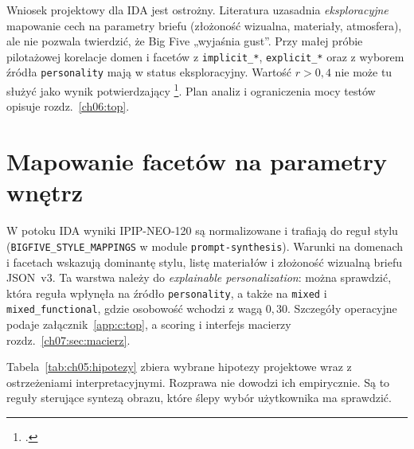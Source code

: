 Wniosek projektowy dla IDA jest ostrożny. Literatura uzasadnia \emph{eksploracyjne} mapowanie cech na parametry briefu (złożoność wizualna, materiały, atmosfera), ale nie pozwala twierdzić, że Big Five „wyjaśnia gust”.
Przy małej próbie pilotażowej korelacje domen i facetów z \texttt{implicit\_*}, \texttt{explicit\_*} oraz z wyborem źródła \texttt{personality} mają w  status eksploracyjny. Wartość $r\!>\!0{,}4$ nie może tu służyć jako wynik potwierdzający \footcite{idaPlatform2026}.
Plan analiz i ograniczenia mocy testów opisuje rozdz.~\ref{ch06:top}.

\section{Mapowanie facetów na parametry wnętrz}
\label{ch05:sec:mapowanie}

W potoku IDA wyniki IPIP-NEO-120 są normalizowane i trafiają do reguł stylu (\texttt{BIGFIVE\_STYLE\_MAPPINGS} w module \texttt{prompt-synthesis}).
Warunki na domenach i facetach wskazują dominantę stylu, listę materiałów i złożoność wizualną briefu JSON~v3.
Ta warstwa należy do \emph{explainable personalization}: można sprawdzić, która reguła wpłynęła na źródło \texttt{personality}, a także na \texttt{mixed} i \texttt{mixed\_functional}, gdzie osobowość wchodzi z wagą $0{,}30$.
Szczegóły operacyjne podaje załącznik~\ref{app:c:top}, a scoring i interfejs macierzy rozdz.~\ref{ch07:sec:macierz}.

Tabela~\ref{tab:ch05:hipotezy} zbiera wybrane hipotezy projektowe wraz z ostrzeżeniami interpretacyjnymi. Rozprawa nie dowodzi ich empirycznie.
Są to reguły sterujące syntezą obrazu, które ślepy wybór użytkownika ma sprawdzić.

